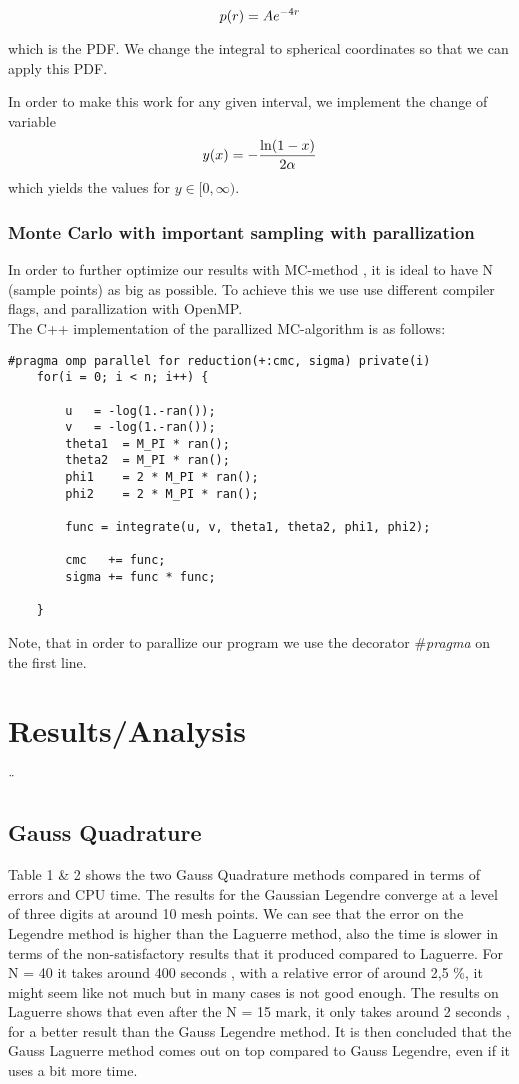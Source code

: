 \documentclass{article}
\begin{document}
\begin{equation}
  \notag
  p(r) = Ae^{-4r}
\end{equation} 

which is the PDF. We change the integral to spherical coordinates so that we can apply this PDF.

In order to make this work for any given interval, we implement the change of variable
\begin{equation}
  \notag
  y(x) = -\frac{\ln(1 - x)}{2\alpha}
\end{equation}
which yields the values for $y \in [0, \infty)$.

\subsubsection{Monte Carlo with important sampling with parallization}\label{const_mot}
In order to further optimize our results with MC-method , it is ideal to have N (sample points) as big as possible. To achieve this we use use different compiler flags, and parallization with OpenMP.
\\
The C++ implementation of the parallized MC-algorithm is as follows:
\begin{lstlisting}
#pragma omp parallel for reduction(+:cmc, sigma) private(i)
    for(i = 0; i < n; i++) {

        u 	= -log(1.-ran());
        v 	= -log(1.-ran());
        theta1 	= M_PI * ran();
        theta2 	= M_PI * ran();
        phi1 	= 2 * M_PI * ran();
        phi2 	= 2 * M_PI * ran();

        func = integrate(u, v, theta1, theta2, phi1, phi2);

        cmc   += func;
        sigma += func * func;

    } 

\end{lstlisting}

Note, that in order to parallize our program we use the decorator #\textit{pragma} on the first line.

\section{Results/Analysis}¨
	\subsection{Gauss Quadrature}
	
	    Table 1 \& 2 shows the two Gauss Quadrature methods compared in terms of errors and CPU time. The results for the Gaussian Legendre converge at a level of three digits at around 10 mesh points. We can see that the error on the Legendre method is higher than the Laguerre method, also the time is slower in terms of the non-satisfactory results that it produced compared to Laguerre. For N = 40 it takes around 400 seconds , with a relative error of around 2,5 \%, it might seem like not much but in many cases is not good enough. The results on Laguerre shows that even after the N = 15 mark, it only takes around 2 seconds , for a better result than the Gauss Legendre method. It is then concluded that the Gauss Laguerre method comes out on top compared to Gauss Legendre, even if it uses a bit more time. 
\end{document}
